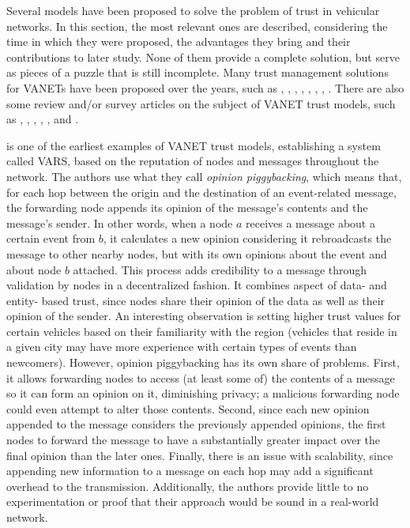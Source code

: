 Several models have been proposed to solve the problem of trust in vehicular networks. 
In this section, the most relevant ones are described, considering the time in which they were proposed, the advantages they bring and their contributions to later study. 
None of them provide a complete solution, but serve as pieces of a puzzle that is still incomplete. 
Many trust management solutions for VANETs have been proposed over the years, such as \citep{patwardhan2006data}, \citep{gerlach2007trust}, \citep{raya2008data}, \citep{huang2010situation}, \citep{ding2013novel}, \citep{haddadou2013trust}, \citep{liu2016lsot}, \citep{kerrache2016detection}.
There are also some review and/or survey articles on the subject of VANET trust models, such as \citep{zhang2011survey}, \citep{ma2011survey}, \citep{zhang2012trust}, \citep{mejri2014survey}, \citep{soleymani2015trust} \citep{sengar2016survey}, and \citep{dwivedi2016review}. 

\citep{dotzer2005vars} is one of the earliest examples of VANET trust models, establishing a system called VARS, based on the reputation of nodes and messages throughout the network.
The authors use what they call \textit{opinion piggybacking}, which means that, for each hop between the origin and the destination of an event-related message, the forwarding node appends its opinion of the message's contents and the message's sender.
In other words, when a node $a$ receives a message about a certain event from $b$, it calculates a new opinion considering  it rebroadcasts the message to other nearby nodes, but with its own opinions about the event and about node $b$ attached.
This process adds credibility to a message through validation by nodes in a decentralized fashion.
It combines aspect of data- and entity- based trust, since nodes share their opinion of the data as well as their opinion of the sender. 
An interesting observation is setting higher trust values for certain vehicles based on their familiarity with the region (vehicles that reside in a given city may have more experience with certain types of events than newcomers).
However, opinion piggybacking has its own share of problems.
First, it allows forwarding nodes to access (at least some of) the contents of a message so it can form an opinion on it, diminishing privacy; a malicious forwarding node could even attempt to alter those contents.
Second, since each new opinion appended to the message considers the previously appended opinions, the first nodes to forward the message to have a substantially greater impact over the final opinion than the later ones.
Finally, there is an issue with scalability, since appending new information to a message on each hop may add a significant overhead to the transmission. Additionally, the authors provide little to no experimentation or proof that their approach would be sound in a real-world network.

